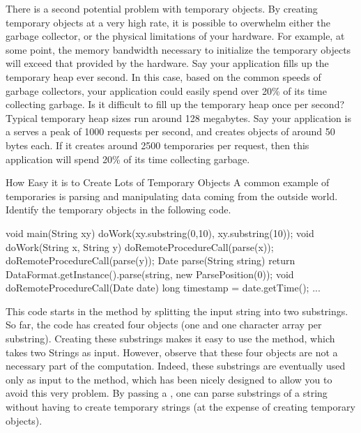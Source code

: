 There is a second potential problem with temporary objects. By creating temporary
objects at a very high rate, it is possible to overwhelm either the garbage
collector, or the physical limitations of your hardware. For example, at some
point, the memory bandwidth necessary to initialize the temporary objects will
exceed that provided by the hardware. Say your application fills up the temporary
heap ever second. In this case, based on the common speeds of garbage collectors,
your application could easily
 spend over 20\% of its time collecting garbage. Is it difficult to fill up the
 temporary heap once per second? Typical temporary heap sizes run around 128
 megabytes. Say your application is a serves a peak of 1000 requests per second,
 and creates objects of around 50 bytes each. If it creates around 2500
 temporaries per request, then this application will spend 20\% of its time
 collecting garbage.



\begin{example}{How Easy it is to Create Lots of Temporary Objects}
A common example of temporaries is parsing
and manipulating data coming from the outside world. Identify the temporary
objects in the following code.

\begin{shortlisting}%
void main(String xy) {
	doWork(xy.substring(0,10), xy.substring(10));
}	
void doWork(String x, String y) {
	doRemoteProcedureCall(parse(x));
	doRemoteProcedureCall(parse(y));
}
Date parse(String string) {
	return DataFormat.getInstance().parse(string, new ParsePosition(0));
}
void doRemoteProcedureCall(Date date) {
	long timestamp = date.getTime();
	...
}
\end{shortlisting}
\end{example} 

This code starts in the  method by splitting the input string into two
substrings. So far, the code has created four objects (one  and one
character array per substring). Creating these substrings makes it easy to use
the  method, which takes two Strings as input. However, observe that
these four objects are not a necessary part of the computation. Indeed, these
substrings are eventually used only as input to the 
 method, which has been nicely designed to allow you to avoid this
very problem. By passing a , one can parse substrings of a
string without having to create temporary strings (at the expense of creating
temporary  objects).



